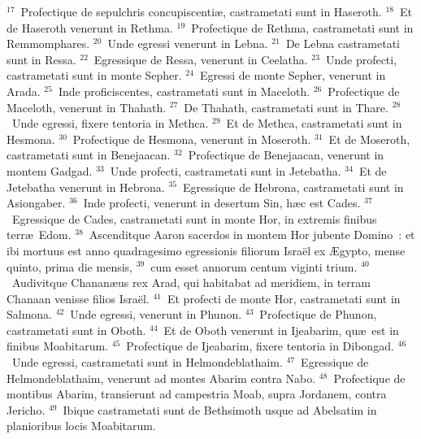 ${}^{17}$~Profectique de sepulchris concupiscenti\ae , castrametati sunt in Haseroth.
${}^{18}$~Et de Haseroth venerunt in Rethma.
${}^{19}$~Profectique de Rethma, castrametati sunt in Remmomphares.
${}^{20}$~Unde egressi venerunt in Lebna.
${}^{21}$~De Lebna castrametati sunt in Ressa.
${}^{22}$~Egressique de Ressa, venerunt in Ceelatha.
${}^{23}$~Unde profecti, castrametati sunt in monte Sepher.
${}^{24}$~Egressi de monte Sepher, venerunt in Arada.
${}^{25}$~Inde proficiscentes, castrametati sunt in Maceloth.
${}^{26}$~Profectique de Maceloth, venerunt in Thahath.
${}^{27}$~De Thahath, castrametati sunt in Thare.
${}^{28}$~Unde egressi, fixere tentoria in Methca.
${}^{29}$~Et de Methca, castrametati sunt in Hesmona.
${}^{30}$~Profectique de Hesmona, venerunt in Moseroth.
${}^{31}$~Et de Moseroth, castrametati sunt in Benejaacan.
${}^{32}$~Profectique de Benejaacan, venerunt in montem Gadgad.
${}^{33}$~Unde profecti, castrametati sunt in Jetebatha.
${}^{34}$~Et de Jetebatha venerunt in Hebrona.
${}^{35}$~Egressique de Hebrona, castrametati sunt in Asiongaber.
${}^{36}$~Inde profecti, venerunt in desertum Sin, h\ae c est Cades.
${}^{37}$~Egressique de Cades, castrametati sunt in monte Hor, in extremis finibus terr\ae\ Edom.
${}^{38}$~Ascenditque Aaron sacerdos in montem Hor jubente Domino~: et ibi mortuus est anno quadragesimo egressionis filiorum Isra\"el ex \AE gypto, mense quinto, prima die mensis,
${}^{39}$~cum esset annorum centum viginti trium.
${}^{40}$~Audivitque Chanan\ae us rex Arad, qui habitabat ad meridiem, in terram Chanaan venisse filios Isra\"el.
${}^{41}$~Et profecti de monte Hor, castrametati sunt in Salmona.
${}^{42}$~Unde egressi, venerunt in Phunon.
${}^{43}$~Profectique de Phunon, castrametati sunt in Oboth.
${}^{44}$~Et de Oboth venerunt in Ijeabarim, qu\ae\ est in finibus Moabitarum.
${}^{45}$~Profectique de Ijeabarim, fixere tentoria in Dibongad.
${}^{46}$~Unde egressi, castrametati sunt in Helmondeblathaim.
${}^{47}$~Egressique de Helmondeblathaim, venerunt ad montes Abarim contra Nabo.
${}^{48}$~Profectique de montibus Abarim, transierunt ad campestria Moab, supra Jordanem, contra Jericho.
${}^{49}$~Ibique castrametati sunt de Bethsimoth usque ad Abelsatim in planioribus locis Moabitarum.


